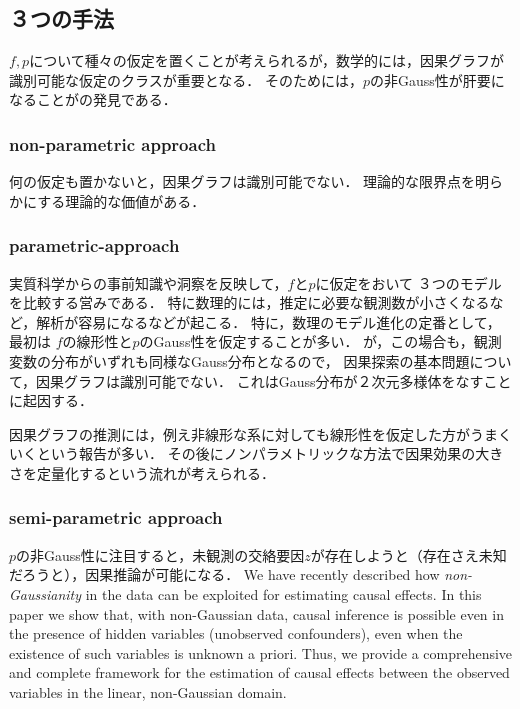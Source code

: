 \documentclass[uplatex,dvipdfmx]{jsreport}
\begin{document}
\subsection{３つの手法}

\begin{tcolorbox}[colframe=ForestGreen, colback=ForestGreen!10!white,breakable,colbacktitle=ForestGreen!40!white,coltitle=black,fonttitle=\bfseries\sffamily,
title=]
    $f,p$について種々の仮定を置くことが考えられるが，数学的には，因果グラフが識別可能な仮定のクラスが重要となる．
    そのためには，$p$の非Gauss性が肝要になることが\cite{清水昌平}の発見である．
\end{tcolorbox}

\subsubsection{non-parametric approach}

何の仮定も置かないと，因果グラフは識別可能でない．
理論的な限界点を明らかにする理論的な価値がある．

\subsubsection{parametric-approach}

実質科学からの事前知識や洞察を反映して，$f$と$p$に仮定をおいて
３つのモデルを比較する営みである．
特に数理的には，推定に必要な観測数が小さくなるなど，解析が容易になるなどが起こる．
特に，数理のモデル進化の定番として，最初は
$f$の線形性と$p$のGauss性を仮定することが多い．
が，この場合も，観測変数の分布がいずれも同様なGauss分布となるので，
因果探索の基本問題について，因果グラフは識別可能でない．
これはGauss分布が２次元多様体をなすことに起因する．

\begin{remark}
    因果グラフの推測には，例え非線形な系に対しても線形性を仮定した方がうまくいくという報告が多い．
    その後にノンパラメトリックな方法で因果効果の大きさを定量化するという流れが考えられる．
\end{remark}

\subsubsection{semi-parametric approach}

\begin{tcolorbox}[colframe=ForestGreen, colback=ForestGreen!10!white,breakable,colbacktitle=ForestGreen!40!white,coltitle=black,fonttitle=\bfseries\sffamily,
title=]
    $p$の非Gauss性に注目すると，未観測の交絡要因$z$が存在しようと（存在さえ未知だろうと），因果推論が可能になる．
    We have recently described how \textit{non-Gaussianity} in the data can be exploited for estimating causal effects.
    In this paper we show that, with non-Gaussian data, causal inference is possible even in the presence of hidden variables (unobserved confounders),
    even when the existence of such variables is unknown a priori.
    Thus, we provide  a comprehensive and complete framework for the estimation of causal effects between the observed variables in the linear, non-Gaussian domain. \cite{清水08}
\end{tcolorbox}
\end{document}
